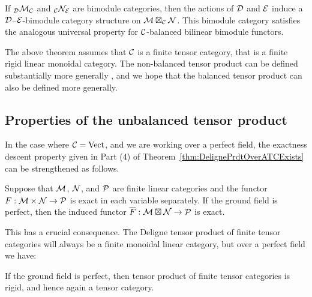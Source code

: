 \documentclass{amsart}
\begin{document}
\begin{remark}
	If ${}_{\mathcal D}\mathcal M_{\mathcal C}$ and ${}_{\mathcal C}\mathcal N_{\mathcal E}$ are bimodule categories, then the actions of $\mathcal D$ and $\mathcal E$ induce a $\mathcal D$--$\mathcal E$-bimodule category structure on $\mathcal M \boxtimes_{\mathcal C} \mathcal N$. This bimodule category satisfies the analogous universal property for $\mathcal C$-balanced bilinear bimodule functors.
\end{remark}

\begin{remark}
The above theorem assumes that $\mathcal C$ is a finite tensor category, that is a finite rigid linear monoidal category.  The non-balanced tensor product can be defined substantially more generally \cite{1212.1545}, and we hope that the balanced tensor product can also be defined more generally.
\end{remark}

\subsection{Properties of the unbalanced tensor product}
  

In the case where $\mathcal C = \mathrm{Vect}$, and we are working over a perfect field, the exactness descent property given in Part (4) of Theorem~\ref{thm:DelignePrdtOverATCExists} can be strengthened as follows.

\begin{lemma}[{\cite[Pr.~5.13(vi)]{MR1106898}}]%
	Suppose that $\mathcal M$, $\mathcal N$, and $\mathcal P$ are finite linear categories and the functor $F: \mathcal M \times \mathcal N \to \mathcal P$ is exact in each variable separately. If the ground field is perfect, then the induced functor $\overline{F}: \mathcal M \boxtimes \mathcal N \to \mathcal P$ is exact. 
\end{lemma} 

This has a crucial consequence. The Deligne tensor product of finite tensor categories will always be a finite monoidal linear category, but over a perfect field we have:

\begin{corollary}[{\cite[Pr.~5.17]{MR1106898}}]%
	If the ground field is perfect, then tensor product of finite tensor categories is rigid, and hence again a tensor category. 
\end{corollary}
\end{document}
